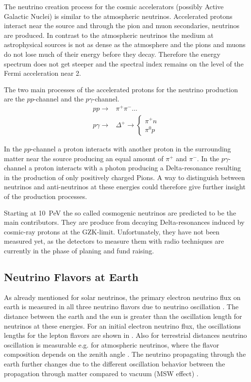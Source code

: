 The neutrino creation process for the cosmic accelerators (possibly Active Galactic Nuclei) is similar to the atmospheric neutrinos.
Accelerated protons interact near the source and through the pion and muon secondaries, neutrinos are produced.
In contrast to the atmospheric neutrinos the medium at astrophysical sources is not as dense as the atmosphere and the pions and muons do not lose much of their energy before they decay.
Therefore the energy spectrum does not get steeper and the spectral index remains on the level of the Fermi acceleration near 2.

The two main processes of the accelerated protons for the neutrino production are the $pp$-channel and the $p\gamma$-channel.
\begin{align}
    p p \to & \pi^+ \pi^- \dots \\
    p \gamma \to & \Delta^+ \to \begin{cases} \pi^+ n \\ \pi^0 p \end{cases}
\end{align}

In the $pp$-channel a proton interacts with another proton in the surrounding matter near the source producing an equal amount of $\pi^+$ and $\pi^-$.
In the $p\gamma$-channel a proton interacts with a photon producing a Delta-resonance resulting in the production of only positively charged Pions.
A way to distinguish between neutrinos and anti-neutrinos at these energies could therefore give further insight of the production processes.

Starting at \SI{10}{PeV} the so called cosmogenic neutrinos are predicted to be the main contributors.
They are produce from decaying Delta-resonances induced by cosmic-ray protons at the GZK-limit.
Unfortunately, they have not been measured yet, as the detectors to measure them with radio techniques are currently in the phase of planing and fund raising.

\subsection{Neutrino Flavors at Earth} \label{sec:nu_osc}

As already mentioned for solar neutrinos, the primary electron neutrino flux on earth is measured in all three neutrino flavors due to neutrino oscillation \cite{SNO01Oscillation}.
The distance between the earth and the sun is greater than the oscillation length for neutrinos at these energies.
For an initial electron neutrino flux, the oscillations lengths for the lepton flavors are shown in .
Also for terrestrial distances neutrino oscillation is measurable e.g. for atmospheric neutrinos, where the flavor composition depends on the zenith angle \cite{SK98Oscillation}.
The neutrino propagating through the earth further changes due to the different oscillation behavior between the propagation through matter compared to vacuum (MSW effect) \cite{Mikheyev85, Wolfenstein79}.

